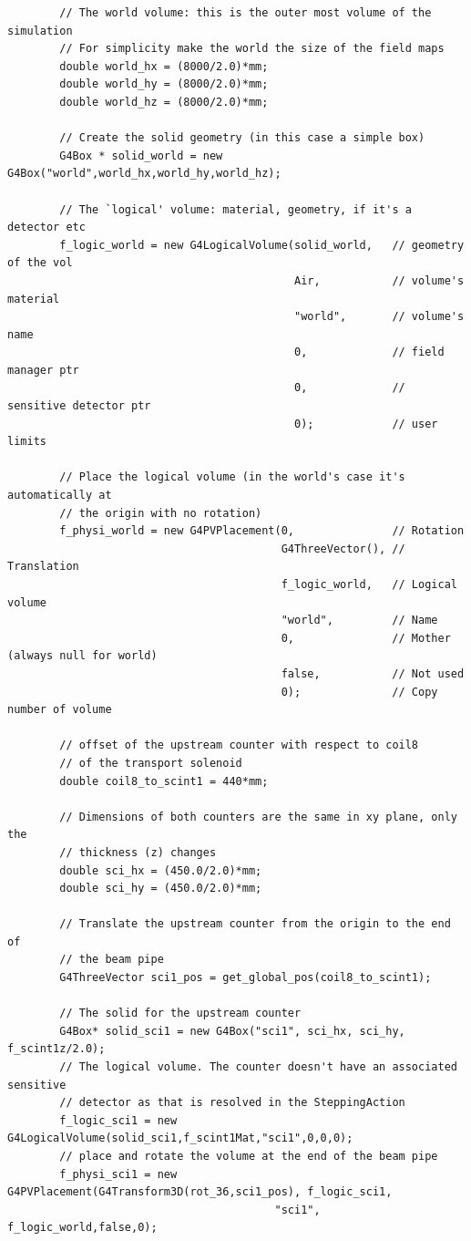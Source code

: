 \documentclass[]{article}
\begin{document}
\begin{verbatim}
        // The world volume: this is the outer most volume of the simulation
        // For simplicity make the world the size of the field maps
        double world_hx = (8000/2.0)*mm; 
        double world_hy = (8000/2.0)*mm;
        double world_hz = (8000/2.0)*mm;
        
        // Create the solid geometry (in this case a simple box)
        G4Box * solid_world = new G4Box("world",world_hx,world_hy,world_hz);
        
        // The `logical' volume: material, geometry, if it's a detector etc
        f_logic_world = new G4LogicalVolume(solid_world,   // geometry of the vol
                                            Air,           // volume's material
                                            "world",       // volume's name
                                            0,             // field manager ptr
                                            0,             // sensitive detector ptr
                                            0);            // user limits
        
        // Place the logical volume (in the world's case it's automatically at 
        // the origin with no rotation)
        f_physi_world = new G4PVPlacement(0,               // Rotation
                                          G4ThreeVector(), // Translation
                                          f_logic_world,   // Logical volume
                                          "world",         // Name
                                          0,               // Mother (always null for world)
                                          false,           // Not used
                                          0);              // Copy number of volume
    
        // offset of the upstream counter with respect to coil8 
        // of the transport solenoid
        double coil8_to_scint1 = 440*mm; 
        
        // Dimensions of both counters are the same in xy plane, only the 
        // thickness (z) changes
        double sci_hx = (450.0/2.0)*mm; 
        double sci_hy = (450.0/2.0)*mm;
        
        // Translate the upstream counter from the origin to the end of
        // the beam pipe
        G4ThreeVector sci1_pos = get_global_pos(coil8_to_scint1);
        
        // The solid for the upstream counter
        G4Box* solid_sci1 = new G4Box("sci1", sci_hx, sci_hy, f_scint1z/2.0);
        // The logical volume. The counter doesn't have an associated sensitive
        // detector as that is resolved in the SteppingAction
        f_logic_sci1 = new G4LogicalVolume(solid_sci1,f_scint1Mat,"sci1",0,0,0);
        // place and rotate the volume at the end of the beam pipe
        f_physi_sci1 = new G4PVPlacement(G4Transform3D(rot_36,sci1_pos), f_logic_sci1, 
                                         "sci1", f_logic_world,false,0);
    

\end{verbatim}
\end{document}
